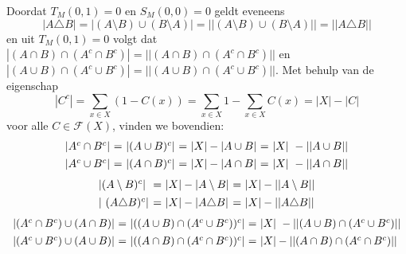 Doordat $T_M(0,1)=0$ en $S_M(0,0)=0$ geldt eveneens
\begin{displaymath}
| A \triangle B | = | (A \setminus B) \cup (B \setminus A) | = || (A \setminus B) \cup (B \setminus A) || = || A \triangle B ||
\end{displaymath}
en uit $T_M(0,1)=0$ volgt dat 
$|(A \cap B) \cap (A^c \cap B^c)| = ||(A \cap B) \cap (A^c \cap B^c)||$ en
$|(A \cup B) \cap (A^c \cup B^c)| = ||(A \cup B) \cap (A^c \cup B^c)||$.
Met behulp van de eigenschap
\begin{displaymath}
|C^c| = \sum_{x \in X} (1 - C(x)) = \sum_{x \in X} 1 - \sum_{x \in X} C(x) = |X| - |C|
\end{displaymath}
voor alle $C \in \mathcal{F}(X)$, vinden we bovendien:
\begin{displaymath}
\begin{array}{l@{\ =\ }l@{\ =\ }l@{\ =\ }l}
|A^c \cap B^c| & |(A \cup B)^c| & |X| - |A \cup B| & |X| - ||A \cup B|| \\[4pt]
|A^c \cup B^c| & |(A \cap B)^c| & |X| - |A \cap B| & |X| - ||A \cap B||
\end{array}
\end{displaymath}
\begin{displaymath}
\begin{array}{l@{\ =\ }l@{\ =\ }l}
| (A \setminus B)^c | & |X| - |A \setminus B| & |X| - ||A \setminus B|| \\[4pt]
| (A \triangle B)^c | & |X| - |A \triangle B| & |X| - ||A \triangle B||
\end{array}
\end{displaymath}
\begin{displaymath}
\begin{array}{l@{\ =\ }l@{\ =\ }l}
|(A^c \cap B^c) \cup (A \cap B)| & |((A \cup B) \cap (A^c \cup B^c))^c| & |X| - ||(A \cup B) \cap (A^c \cup B^c)|| \\[4pt]
|(A^c \cup B^c) \cup (A \cup B)| & |((A \cap B) \cap (A^c \cap B^c))^c| & |X| - ||(A \cap B) \cap (A^c \cap B^c)||
\end{array}
\end{displaymath}
